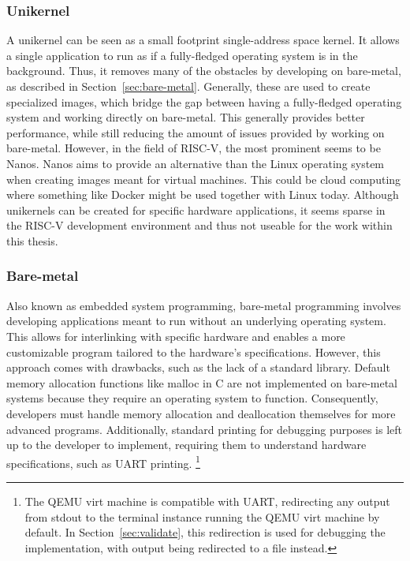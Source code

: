 \subsubsection*{Unikernel}
A unikernel can be seen as a small footprint single-address space kernel. It
allows a single application to run as if a fully-fledged operating system is in
the background. Thus, it removes many of the obstacles by developing on
bare-metal, as described in Section~\ref{sec:bare-metal}. Generally, these are
used to create specialized images, which bridge the gap between having a
fully-fledged operating system and working directly on bare-metal. This
generally provides better performance, while still reducing the amount of issues
provided by working on bare-metal. However, in the field of RISC-V, the most
prominent seems to be Nanos. Nanos aims to provide an alternative than the Linux
operating system when creating images meant for virtual machines. This could be
cloud computing where something like Docker might be used together with Linux
today. Although unikernels can be created for specific hardware applications, it
seems sparse in the RISC-V development environment and thus not useable for the
work within this thesis.

\subsubsection*{Bare-metal}
Also known as embedded system programming, bare-metal programming involves
developing applications meant to run without an underlying operating system. This
allows for interlinking with specific hardware and enables a more customizable
program tailored to the hardware's specifications. However, this approach comes
with drawbacks, such as the lack of a standard library. Default memory
allocation functions like malloc in C are not implemented on bare-metal systems
because they require an operating system to function. Consequently, developers
must handle memory allocation and deallocation themselves for more advanced
programs. Additionally, standard printing for debugging purposes is left up to
the developer to implement, requiring them to understand hardware
specifications, such as UART printing. \cite{uart}
\footnote{The QEMU virt machine is compatible with UART, redirecting any output
  from stdout
to the terminal instance running the QEMU virt machine by default. In
Section~\ref{sec:validate}, this redirection is used for debugging the
implementation, with output being redirected to a file instead.}


